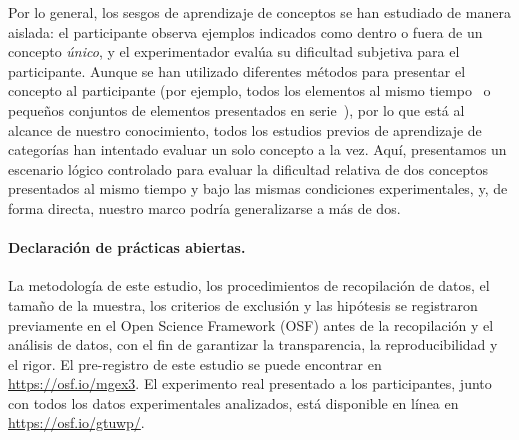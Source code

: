 Por lo general, los sesgos de aprendizaje de conceptos se han estudiado de manera aislada: el participante observa ejemplos indicados como dentro o fuera de un concepto \textit{único}, y el experimentador evalúa su dificultad subjetiva para el participante. Aunque se han utilizado diferentes métodos para presentar el concepto al participante (por ejemplo, todos los elementos al mismo tiempo~\cite{tano2020towards, kemp2012exploring} o pequeños conjuntos de elementos presentados en serie~\cite{piantadosi2016logical}), por lo que está al alcance de nuestro conocimiento, todos los estudios previos de aprendizaje de categorías han intentado evaluar un solo concepto a la vez. Aquí, presentamos un escenario lógico controlado para evaluar la dificultad relativa de dos conceptos presentados al mismo tiempo y bajo las mismas condiciones experimentales, y, de forma directa, nuestro marco podría generalizarse a más de dos.



\paragraph{Declaración de prácticas abiertas.} 
La metodología de este estudio, los procedimientos de recopilación de datos, el tamaño de la muestra, los criterios de exclusión y las hipótesis se registraron previamente en el Open Science Framework (OSF) antes de la recopilación y el análisis de datos, con el fin de garantizar la transparencia, la reproducibilidad y el rigor. El pre-registro de este estudio se puede encontrar en \url{https://osf.io/mgex3}. El experimento real presentado a los participantes, junto con todos los datos experimentales analizados, está disponible en línea en \url{https://osf.io/gtuwp/}.

% 
%



